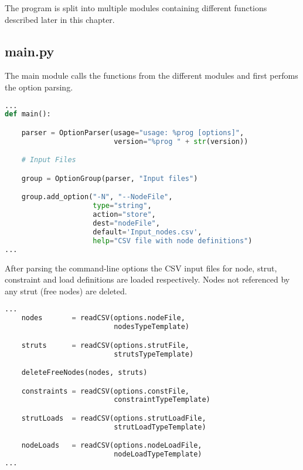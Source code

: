 The program is split into multiple modules containing different functions described later in this chapter.

\subsection{main.py}
\label{subsec:main.py}

The main module calls the functions from the different modules and first perfoms the option parsing.

\begin{inconsolata}
\begin{minipage}{\linewidth}
\begin{lstlisting}[language=python]
...
def main():

    parser = OptionParser(usage="usage: %prog [options]",
                          version="%prog " + str(version))

    # Input Files                                       

    group = OptionGroup(parser, "Input files")

    group.add_option("-N", "--NodeFile",
                     type="string",
                     action="store",
                     dest="nodeFile",
                     default='Input_nodes.csv',
                     help="CSV file with node definitions")
...
\end{lstlisting}
\end{minipage}
\end{inconsolata}

After parsing the command-line options the CSV input files for node, strut, constraint and load definitions are loaded respectively.
Nodes not referenced by any strut (free nodes) are deleted.

\begin{inconsolata}
\begin{minipage}{\linewidth}
\begin{lstlisting}[language=python]
...
    nodes       = readCSV(options.nodeFile,
                          nodesTypeTemplate)

    struts      = readCSV(options.strutFile,
                          strutsTypeTemplate)

    deleteFreeNodes(nodes, struts)

    constraints = readCSV(options.constFile,
                          constraintTypeTemplate)

    strutLoads  = readCSV(options.strutLoadFile,
                          strutLoadTypeTemplate)

    nodeLoads   = readCSV(options.nodeLoadFile,
                          nodeLoadTypeTemplate)
...
\end{lstlisting}
\end{minipage}
\end{inconsolata}

